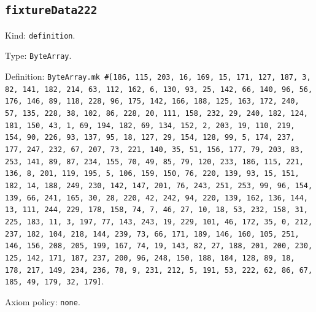 \documentclass[11pt]{article}
\begin{document}
\subsection*{\texttt{fixtureData222}}
\noindent Kind: \texttt{definition}.\par
\noindent Type: \texttt{ByteArray}.\par
\noindent Definition: \texttt{ByteArray.mk \#[186, 115, 203, 16, 169, 15, 171, 127, 187, 3, 82, 141, 182, 214, 63, 112, 162, 6, 130, 93, 25, 142, 66, 140, 96, 56, 176, 146, 89, 118, 228, 96, 175, 142, 166, 188, 125, 163, 172, 240, 57, 135, 228, 38, 102, 86, 228, 20, 111, 158, 232, 29, 240, 182, 124, 181, 150, 43, 1, 69, 194, 182, 69, 134, 152, 2, 203, 19, 110, 219, 154, 90, 226, 93, 137, 95, 18, 127, 29, 154, 128, 99, 5, 174, 237, 177, 247, 232, 67, 207, 73, 221, 140, 35, 51, 156, 177, 79, 203, 83, 253, 141, 89, 87, 234, 155, 70, 49, 85, 79, 120, 233, 186, 115, 221, 136, 8, 201, 119, 195, 5, 106, 159, 150, 76, 220, 139, 93, 15, 151, 182, 14, 188, 249, 230, 142, 147, 201, 76, 243, 251, 253, 99, 96, 154, 139, 66, 241, 165, 30, 28, 220, 42, 242, 94, 220, 139, 162, 136, 144, 13, 111, 244, 229, 178, 158, 74, 7, 46, 27, 10, 18, 53, 232, 158, 31, 225, 183, 11, 3, 197, 77, 143, 243, 19, 229, 101, 46, 172, 35, 0, 212, 237, 182, 104, 218, 144, 239, 73, 66, 171, 189, 146, 160, 105, 251, 146, 156, 208, 205, 199, 167, 74, 19, 143, 82, 27, 188, 201, 200, 230, 125, 142, 171, 187, 237, 200, 96, 248, 150, 188, 184, 128, 89, 18, 178, 217, 149, 234, 236, 78, 9, 231, 212, 5, 191, 53, 222, 62, 86, 67, 185, 49, 179, 32, 179]}.\par
\noindent Axiom policy: \texttt{none}.\par
\end{document}
